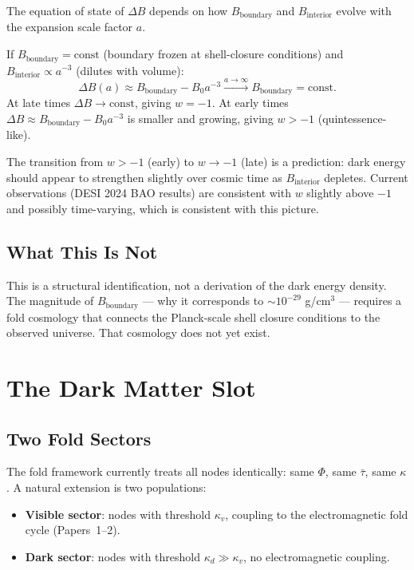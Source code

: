 \documentclass[12pt]{article}
\newcommand{\taubar}{\bar{\tau}}
\begin{document}
The equation of state of $\Delta B$ depends on how $B_{\mathrm{boundary}}$
and $B_{\mathrm{interior}}$ evolve with the expansion scale factor $a$.

If $B_{\mathrm{boundary}} = \mathrm{const}$ (boundary frozen at
shell-closure conditions) and $B_{\mathrm{interior}} \propto a^{-3}$
(dilutes with volume):
\begin{equation}
  \Delta B(a) \approx B_{\mathrm{boundary}} - B_0 a^{-3}
  \xrightarrow{a \to \infty} B_{\mathrm{boundary}} = \mathrm{const}.
\end{equation}
At late times $\Delta B \to \mathrm{const}$, giving $w = -1$.
At early times $\Delta B \approx B_{\mathrm{boundary}} - B_0 a^{-3}$
is smaller and growing, giving $w > -1$ (quintessence-like).

The transition from $w > -1$ (early) to $w \to -1$ (late) is a
prediction: dark energy should appear to strengthen slightly over cosmic
time as $B_{\mathrm{interior}}$ depletes. Current observations
(DESI 2024 BAO results) are consistent with $w$ slightly above $-1$
and possibly time-varying, which is consistent with this picture.

\subsection{What This Is Not}

This is a structural identification, not a derivation of the dark energy
density. The magnitude of $B_{\mathrm{boundary}}$ --- why it corresponds
to $\sim 10^{-29}$ g/cm$^3$ --- requires a fold cosmology that connects
the Planck-scale shell closure conditions to the observed universe. That
cosmology does not yet exist.

\section{The Dark Matter Slot}

\subsection{Two Fold Sectors}

The fold framework currently treats all nodes identically: same $\Phi$,
same $\taubar$, same $\kappa$. A natural extension is two populations:

\begin{itemize}
  \item \textbf{Visible sector}: nodes with threshold $\kappa_v$,
        coupling to the electromagnetic fold cycle (Papers~1--2).
  \item \textbf{Dark sector}: nodes with threshold $\kappa_d \gg \kappa_v$,
        no electromagnetic coupling.
\end{itemize}
\end{document}
